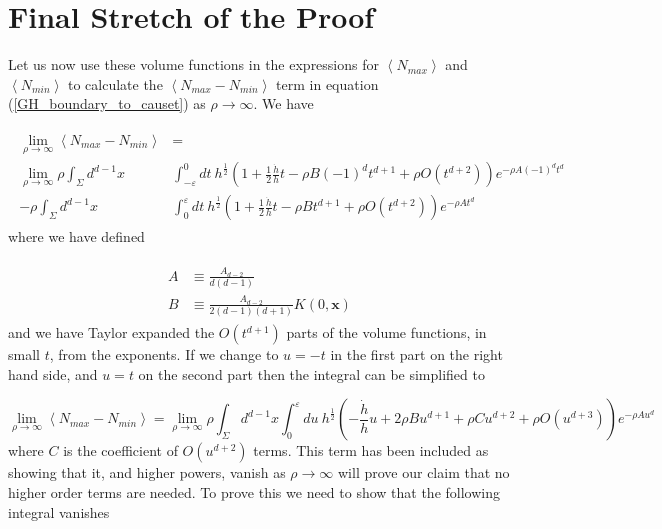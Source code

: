 \documentclass[12pt]{article}
\newcommand{\be}{\begin{equation}}
\newcommand{\ee}{\end{equation}}
\begin{document}
\section{Final Stretch of the Proof}

Let us now use these volume functions in the expressions for $\left\langle N_{max}\right\rangle$ and $\left\langle N_{min}\right\rangle$ to calculate the $\left\langle N_{max}-N_{min}\right\rangle$ term in equation (\ref{GH_boundary_to_causet}) as $\rho \rightarrow \infty$. We have

\begin{gather}\label{eq:NmaxNminStart}
\begin{aligned}
\lim_{\rho \to \infty}\left\langle N_{max}-N_{min} \right\rangle &= \\
\lim_{\rho \to \infty}\rho
\int_{\Sigma}d^{d-1}x & \int_{-\varepsilon}^{0}dt\
h^{\frac{1}{2}}\left(1+
\frac{1}{2}\frac{\dot{h}}{h}t-\rho B(-1)^{d}t^{d+1}+\rho O(t^{d+2})\right)e^{-\rho A(-1)^{d}t^{d}} \\
-\rho\int_{\Sigma}d^{d-1}x &
\int_{0}^{\varepsilon}dt\
h^{\frac{1}{2}}\left(1+
\frac{1}{2}\frac{\dot{h}}{h}t-\rho Bt^{d+1}+\rho O(t^{d+2})\right)e^{-\rho At^{d}}
\end{aligned}
\end{gather}
where we have defined

\begin{gather}\label{A_and_B_defn}
\begin{aligned}
A & \equiv \frac{A_{d-2}}{d(d-1)} \\
B & \equiv \frac{A_{d-2}}{2(d-1)(d+1)}K(0,\mathbf{x})
\end{aligned}
\end{gather}
and we have Taylor expanded the $O(t^{d+1})$ parts of the volume functions, in small $t$, from the exponents. If we change to $u=-t$ in the first part on the right hand side, and $u=t$ on the second part then the integral can be simplified to

\be\label{eq:NmaxNminSimplified}
\lim_{\rho \to \infty}\left\langle N_{max}-N_{min} \right\rangle=
\lim_{\rho \to \infty}\rho
\int_{\Sigma}d^{d-1}x \int_{0}^{\varepsilon}du\
h^{\frac{1}{2}}\left(-\frac{\dot{h}}{h}u+2\rho B u^{d+1}+\rho Cu^{d+2}+\rho O(u^{d+3}) \right)e^{-\rho Au^{d}}
\ee
where $C$ is the coefficient of $O(u^{d+2})$ terms. This term has been included as showing that it, and higher powers, vanish as $\rho \rightarrow\infty$ will prove our claim that no higher order terms are needed. To prove this we need to show that the following integral vanishes
\end{document}
